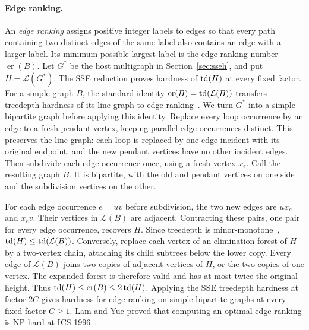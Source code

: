 \paragraph{Edge ranking.}
An \emph{edge ranking} assigns positive integer labels to edges
so that every path containing two distinct edges of the same
label also contains an edge with a larger label. Its minimum
possible largest label is the edge-ranking number
$\operatorname{er}(B)$.
Let $G^*$ be the host multigraph in Section~\ref{sec:sseh}, and put
$H=\mathcal L(G^*)$. The \textup{SSE} reduction proves hardness of
$\operatorname{td}(H)$ at every fixed factor. For a simple graph $B$, the standard
identity $\operatorname{er}(B)=\operatorname{td}(\mathcal L(B))$ transfers
treedepth hardness of its line graph to edge ranking~\cite{BodlaenderRankings}.
We turn $G^*$ into a simple bipartite graph before applying this
identity. Replace every loop occurrence by an edge to a fresh pendant
vertex, keeping parallel edge occurrences distinct. This preserves
the line graph: each loop is replaced by one edge incident with its
original endpoint, and the new pendant vertices have no other
incident edges. Then subdivide each edge occurrence once, using a
fresh vertex $x_e$. Call the resulting graph $B$. It is bipartite,
with the old and pendant vertices on one side and the subdivision
vertices on the other.

For each edge occurrence $e=uv$ before subdivision, the two new
edges are $ux_e$ and $x_ev$. Their vertices in $\mathcal L(B)$ are
adjacent. Contracting these pairs, one pair for every edge occurrence,
recovers $H$. Since treedepth is minor-monotone~\cite[Section~1]{Reidl2014},
$\operatorname{td}(H)\leq\operatorname{td}(\mathcal L(B))$. Conversely, replace each vertex of
an elimination forest of $H$ by a two-vertex chain, attaching its
child subtrees below the lower copy. Every edge of $\mathcal L(B)$
joins two copies of adjacent vertices of $H$, or the two copies of
one vertex. The expanded forest is therefore valid and has at most
twice the original height. Thus
$\operatorname{td}(H)\leq\operatorname{er}(B)\leq2\operatorname{td}(H)$. Applying the \textup{SSE}
treedepth hardness at factor $2C$ gives hardness for edge ranking on
simple bipartite graphs at every fixed factor $C\geq1$.
Lam and Yue proved that computing an optimal edge ranking is \textup{NP}-hard
at ICS 1996~\cite{LamYue1996}.

